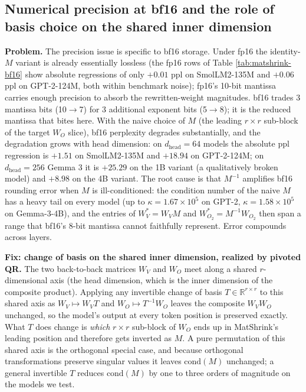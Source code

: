 \documentclass{article}
\begin{document}
\subsection{Numerical precision at bf16 and the role of basis choice on the shared inner dimension}
\label{sec:matshrink-precision}

\textbf{Problem.} The precision issue is specific to bf16 storage. Under fp16 the identity-$M$ variant is already essentially lossless (the fp16 rows of Table \ref{tab:matshrink-bf16} show absolute regressions of only $+0.01$ ppl on SmolLM2-135M and $+0.06$ ppl on GPT-2-124M, both within benchmark noise); fp16's 10-bit mantissa carries enough precision to absorb the rewritten-weight magnitudes. bf16 trades 3 mantissa bits (10$\to$7) for 3 additional exponent bits (5$\to$8); it is the reduced mantissa that bites here. With the naive choice of $M$ (the leading $r \times r$ sub-block of the target $W_O$ slice), bf16 perplexity degrades substantially, and the degradation grows with head dimension: on $d_\text{head} = 64$ models the absolute ppl regression is $+1.51$ on SmolLM2-135M and $+18.94$ on GPT-2-124M; on $d_\text{head} = 256$ Gemma 3 it is $+25.29$ on the 1B variant (a qualitatively broken model) and $+8.98$ on the 4B variant. The root cause is that $M^{-1}$ amplifies bf16 rounding error when $M$ is ill-conditioned: the condition number of the naive $M$ has a heavy tail on every model (up to $\kappa = 1.67 \times 10^5$ on GPT-2, $\kappa = 1.58 \times 10^5$ on Gemma-3-4B), and the entries of $W_V^\ast = W_V M$ and $W_{O_2}^\ast = M^{-1} W_{O_2}$ then span a range that bf16's 8-bit mantissa cannot faithfully represent. Error compounds across layers.

\textbf{Fix: change of basis on the shared inner dimension, realized by pivoted QR.} The two back-to-back matrices $W_V$ and $W_O$ meet along a shared $r$-dimensional axis (the head dimension, which is the inner dimension of the composite product). Applying any invertible change of basis $T \in \mathbb{R}^{r \times r}$ to this shared axis as $W_V \mapsto W_V T$ and $W_O \mapsto T^{-1} W_O$ leaves the composite $W_V W_O$ unchanged, so the model's output at every token position is preserved exactly. What $T$ does change is \emph{which} $r \times r$ sub-block of $W_O$ ends up in MatShrink's leading position and therefore gets inverted as $M$. A pure permutation of this shared axis is the orthogonal special case, and because orthogonal transformations preserve singular values it leaves $\text{cond}(M)$ unchanged; a general invertible $T$ reduces $\text{cond}(M)$ by one to three orders of magnitude on the models we test.
\end{document}
